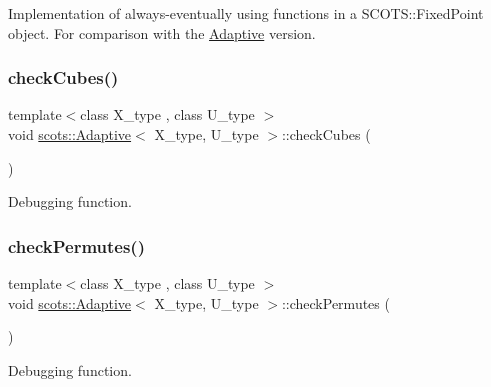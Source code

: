 Implementation of always-\/eventually using functions in a S\+C\+O\+T\+S\+::\+Fixed\+Point object. For comparison with the \hyperlink{classscots_1_1Adaptive}{Adaptive} version. \mbox{\label{classscots_1_1Adaptive_a5e8e6dc690e2c800338fd2c866af8889}} 
\subsubsection{\texorpdfstring{check\+Cubes()}{checkCubes()}}
{\footnotesize\ttfamily template$<$class X\+\_\+type , class U\+\_\+type $>$ \\
void \hyperlink{classscots_1_1Adaptive}{scots\+::\+Adaptive}$<$ X\+\_\+type, U\+\_\+type $>$\+::check\+Cubes (\begin{DoxyParamCaption}{ }\end{DoxyParamCaption})\hspace{0.3cm}{\ttfamily [inline]}}

Debugging function. \mbox{\label{classscots_1_1Adaptive_aba179a9fad6056239005127af2e95f45}} 
\subsubsection{\texorpdfstring{check\+Permutes()}{checkPermutes()}}
{\footnotesize\ttfamily template$<$class X\+\_\+type , class U\+\_\+type $>$ \\
void \hyperlink{classscots_1_1Adaptive}{scots\+::\+Adaptive}$<$ X\+\_\+type, U\+\_\+type $>$\+::check\+Permutes (\begin{DoxyParamCaption}{ }\end{DoxyParamCaption})\hspace{0.3cm}{\ttfamily [inline]}}

Debugging function. \mbox{\label{classscots_1_1Adaptive_af6aeb2170e7223c1396454ab2b83fb09}} 
